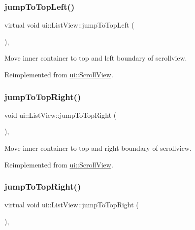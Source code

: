 \subsubsection{\texorpdfstring{jump\+To\+Top\+Left()}{jumpToTopLeft()}\hspace{0.1cm}{\footnotesize\ttfamily [2/2]}}
{\footnotesize\ttfamily virtual void ui\+::\+List\+View\+::jump\+To\+Top\+Left (\begin{DoxyParamCaption}{ }\end{DoxyParamCaption})\hspace{0.3cm}{\ttfamily [override]}, {\ttfamily [virtual]}}

Move inner container to top and left boundary of scrollview. 

Reimplemented from \hyperlink{classui_1_1ScrollView_ac61119b9f40bf3a81e3a71e3d84c0c90}{ui\+::\+Scroll\+View}.

\mbox{\label{classui_1_1ListView_a9410511689cc348ef305886a44ec0d96}} 
\subsubsection{\texorpdfstring{jump\+To\+Top\+Right()}{jumpToTopRight()}\hspace{0.1cm}{\footnotesize\ttfamily [1/2]}}
{\footnotesize\ttfamily void ui\+::\+List\+View\+::jump\+To\+Top\+Right (\begin{DoxyParamCaption}{ }\end{DoxyParamCaption})\hspace{0.3cm}{\ttfamily [override]}, {\ttfamily [virtual]}}

Move inner container to top and right boundary of scrollview. 

Reimplemented from \hyperlink{classui_1_1ScrollView_ae2496521c218e2e53a364d98f223883b}{ui\+::\+Scroll\+View}.

\mbox{\label{classui_1_1ListView_a7b90df8fdae3bf08a3714c332f8c2854}} 
\subsubsection{\texorpdfstring{jump\+To\+Top\+Right()}{jumpToTopRight()}\hspace{0.1cm}{\footnotesize\ttfamily [2/2]}}
{\footnotesize\ttfamily virtual void ui\+::\+List\+View\+::jump\+To\+Top\+Right (\begin{DoxyParamCaption}{ }\end{DoxyParamCaption})\hspace{0.3cm}{\ttfamily [override]}, {\ttfamily [virtual]}}

